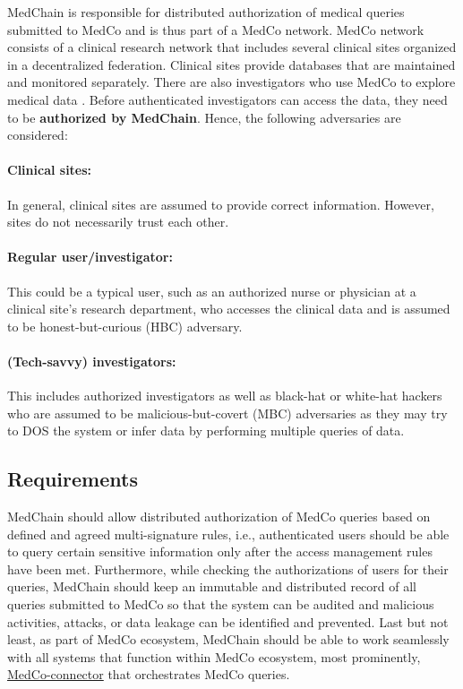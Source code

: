 MedChain is responsible for distributed authorization of medical queries submitted to MedCo and is thus part of a MedCo network. MedCo network consists of a clinical research network that includes several clinical sites organized in a decentralized federation. Clinical sites provide databases that are maintained and monitored separately. There are also investigators who use MedCo to explore medical data \cite{raisaro2017medco}. Before authenticated investigators can access the data, they need to be \textbf{authorized by MedChain}. Hence, the following adversaries are considered:

\paragraph{Clinical sites:} In general, clinical sites are assumed to provide correct information. However, sites do not necessarily trust each other. 

\paragraph{Regular user/investigator:} This could be a typical user, such as an authorized nurse or physician at a clinical site's research department, who accesses the clinical data and is assumed to be honest-but-curious (HBC) adversary.  

\paragraph{(Tech-savvy) investigators:} This includes authorized investigators as well as black-hat or white-hat hackers who are assumed to be malicious-but-covert (MBC) adversaries as they may try to DOS the system or infer data by performing multiple queries of data. 

\subsection{Requirements}
MedChain should allow distributed authorization of MedCo queries based on defined and agreed multi-signature rules, i.e., authenticated users should be able to query certain sensitive information only after the access management rules have been met. Furthermore, while checking the authorizations of users for their queries, MedChain should keep an immutable and distributed record of all queries submitted to MedCo so that the system can be audited and malicious activities, attacks, or data leakage can be identified and prevented. Last but not least, as part of MedCo ecosystem, MedChain should be able to work seamlessly with all systems that function within MedCo ecosystem, most prominently, \href{https://github.com/ldsec/medco-connector}{MedCo-connector} that orchestrates MedCo queries. 

